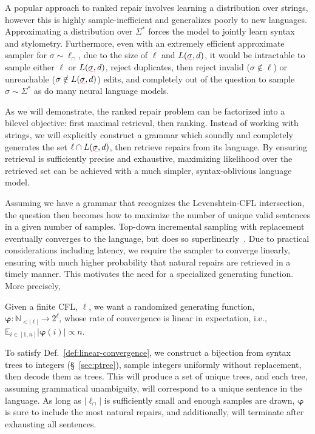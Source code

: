 \documentclass[sigplan,review,acmsmall,nonacm,anonymous]{acmart}\settopmatter{printfolios=false,printccs=false,printacmref=false}
\begin{document}
  A popular approach to ranked repair involves learning a distribution over strings, however this is highly sample-inefficient and generalizes poorly to new languages. Approximating a distribution over $\Sigma^*$ forces the model to jointly learn syntax and stylometry. Furthermore, even with an extremely efficient approximate sampler for $\sigma \sim \ell_\cap$, due to the size of $\ell$ and $L(\err\sigma, d)$, it would be intractable to sample either $\ell$ or $L(\err\sigma, d)$, reject duplicates, then reject invalid ($\sigma \notin \ell$) or unreachable ($\sigma \notin L(\err\sigma, d)$) edits, and completely out of the question to sample $\sigma \sim \Sigma^*$ as do many neural language models.

  As we will demonstrate, the ranked repair problem can be factorized into a bilevel objective: first maximal retrieval, then ranking. Instead of working with strings, we will explicitly construct a grammar which soundly and completely generates the set $\ell \cap L(\err\sigma, d)$, then retrieve repairs from its language. By ensuring retrieval is sufficiently precise and exhaustive, maximizing likelihood over the retrieved set can be achieved with a much simpler, syntax-oblivious language model.

  Assuming we have a grammar that recognizes the Levenshtein-CFL intersection, the question then becomes how to maximize the number of unique valid sentences in a given number of samples. Top-down incremental sampling with replacement eventually converges to the language, but does so superlinearly~\cite{flajolet1992birthday}. Due to practical considerations including latency, we require the sampler to converge linearly, ensuring with much higher probability that natural repairs are retrieved in a timely manner. This motivates the need for a specialized generating function. More precisely,

  \begin{definition}\label{def:linear-convergence}
    Given a finite CFL, $\ell$, we want a randomized generating function, $\bm{\varphi}: \mathbb{N}_{<|\ell|} \rightarrow 2^\ell$, whose rate of convergence is linear in expectation, i.e., $\mathbb{E}_{i \in [1, n]}|\bm{\varphi}(i)| \propto n$.
  \end{definition}

  To satisfy Def.~\ref{def:linear-convergence}, we construct a bijection from syntax trees to integers (\S~\ref{sec:ptree}), sample integers uniformly without replacement, then decode them as trees. This will produce a set of unique trees, and each tree, assuming grammatical unambiguity, will correspond to a unique sentence in the language. As long as $|\ell_\cap|$ is sufficiently small and enough samples are drawn, $\bm\varphi$ is sure to include the most natural repairs, and additionally, will terminate after exhausting all sentences.
\end{document}
